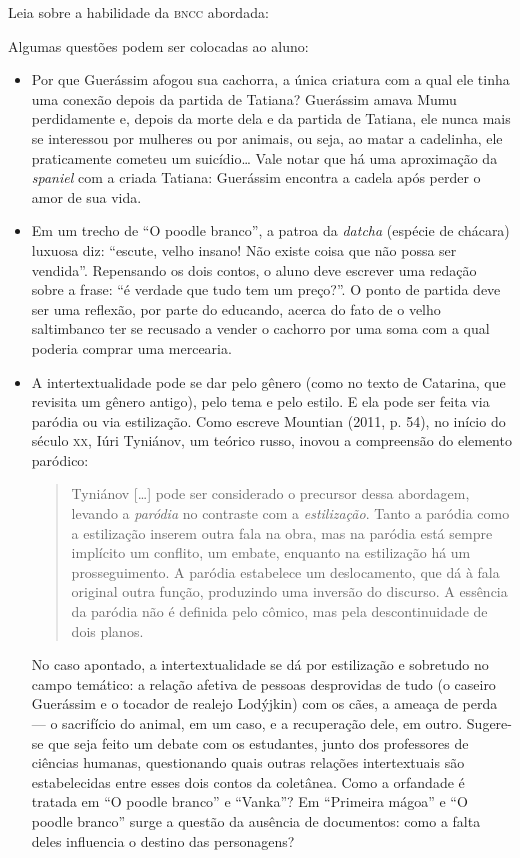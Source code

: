 \documentclass[11pt]{extarticle}
\begin{document}
Leia sobre a habilidade da \textsc{bncc} abordada:

Algumas questões podem ser colocadas ao aluno:

\begin{itemize}
\item Por que Guerássim afogou sua cachorra, a única criatura com a qual ele
tinha uma conexão depois da partida de Tatiana? Guerássim amava Mumu
perdidamente e, depois da morte dela e da partida de Tatiana, ele nunca
mais se interessou por mulheres ou por animais, ou seja, ao matar a
cadelinha, ele praticamente cometeu um suicídio\ldots{} Vale notar que há uma
aproximação da \emph{spaniel} com a criada Tatiana: Guerássim encontra a
cadela após perder o amor de sua vida.

\item Em um trecho de ``O poodle branco'', a patroa da \emph{datcha}
(espécie de chácara) luxuosa diz: ``escute, velho insano! Não existe
coisa que não possa ser vendida''. Repensando os dois contos, o aluno
deve escrever uma redação sobre a frase: ``é verdade que tudo tem um
preço?''. O ponto de partida deve ser uma reflexão, por parte do educando,  acerca do fato de o velho saltimbanco ter se
recusado a vender o cachorro por uma soma com a qual poderia comprar uma
mercearia.

\item A intertextualidade pode se dar pelo gênero (como no texto de
Catarina, que revisita um gênero antigo), pelo tema e pelo estilo. E ela
pode ser feita via paródia ou via estilização. Como escreve Mountian
(2011, p. 54), no início do século \textsc{xx}, Iúri Tyniánov, um teórico russo,
inovou a compreensão do elemento paródico:
\begin{quote}
Tyniánov {[}\ldots{}{]} pode ser considerado o precursor dessa abordagem,
levando a \emph{paródia} no contraste com a \emph{estilização}. Tanto a
paródia como a estilização inserem outra fala na obra, mas na paródia
está sempre implícito um conflito, um embate, enquanto na estilização há
um prosseguimento. A paródia estabelece um deslocamento, que dá à fala
original outra função, produzindo uma inversão do discurso. A essência
da paródia não é definida pelo cômico, mas pela descontinuidade de dois
planos.
\end{quote}


No caso apontado, a intertextualidade se dá por estilização e sobretudo
no campo temático: a relação afetiva de pessoas desprovidas de tudo (o
caseiro Guerássim e o tocador de realejo Lodýjkin) com os cães, a ameaça
de perda --- o sacrifício do animal, em um caso, e a recuperação dele,
em outro. Sugere-se que seja feito um debate com os estudantes, junto dos professores de ciências humanas, questionando quais outras relações intertextuais são estabelecidas
entre esses dois contos da coletânea. Como a orfandade é
tratada em ``O poodle branco'' e ``Vanka''? Em ``Primeira mágoa'' e
``O poodle branco'' surge a questão da ausência de documentos: como a
falta deles influencia o destino das personagens?
\end{itemize}
\end{document}
